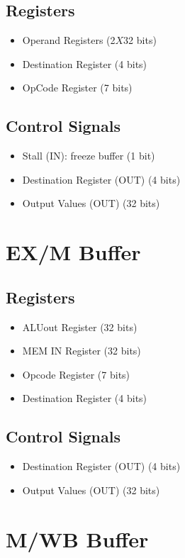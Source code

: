 \documentclass[12pt]{report}
\begin{document}
\subsection{Registers}
\begin{itemize}
    \item Operand Registers (2$X$32 bits)
    \item Destination Register (4 bits)
    \item OpCode Register (7 bits)
\end{itemize}

\subsection{Control Signals}
\begin{itemize}
    \item Stall (IN): freeze buffer (1 bit)
    \item Destination Register (OUT) (4 bits)
    \item Output Values (OUT) (32 bits)
\end{itemize}

\section{EX/M Buffer}

\subsection{Registers}
\begin{itemize}
    \item ALUout Register (32 bits)
    \item MEM IN Register (32 bits)
    \item Opcode Register (7 bits)
    \item Destination Register (4 bits)
\end{itemize}

\subsection{Control Signals}
\begin{itemize}
    \item Destination Register (OUT) (4 bits)
    \item Output Values (OUT) (32 bits)
\end{itemize}

\section{M/WB Buffer}
\end{document}
